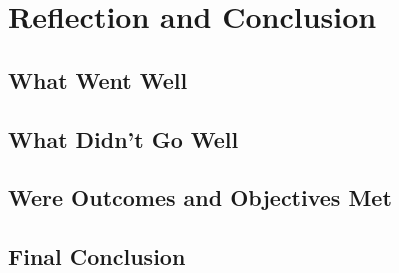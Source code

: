 \chapter{Reflection and Conclusion}
\label{chap:reflection-and-conclusion}

\label{reflection-and-conclusion:what-went-well}
\section{What Went Well}

\label{reflection-and-conclusion:what-didnt-go-well}
\section{What Didn't Go Well}

\label{reflection-and-conclusion:outcomes/objectives-met}
\section{Were Outcomes and Objectives Met}

\label{reflection-and-conclusion:final-conclusion}
\section{Final Conclusion}

